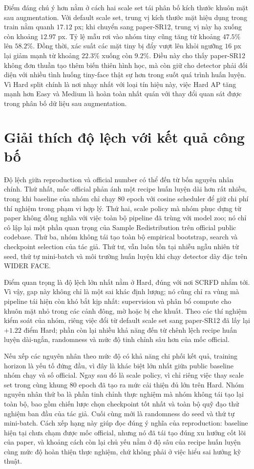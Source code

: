 Điểm đáng chú ý hơn nằm ở cách hai scale set tái phân bố kích thước khuôn mặt sau augmentation. Với default scale set, trung vị kích thước mặt hiệu dụng trong train nằm quanh \(17.12\) px; khi chuyển sang paper-SR12, trung vị này hạ xuống còn khoảng \(12.97\) px. Tỷ lệ mẫu rơi vào nhóm tiny cũng tăng từ khoảng \(47.5\%\) lên \(58.2\%\). Đồng thời, xác suất các mặt tiny bị đẩy vượt lên khỏi ngưỡng \(16\) px lại giảm mạnh từ khoảng \(22.3\%\) xuống còn \(9.2\%\). Điều này cho thấy paper-SR12 không đơn thuần tạo thêm biến thiên hình học, mà còn giữ cho detector phải đối diện với nhiều tình huống tiny-face thật sự hơn trong suốt quá trình huấn luyện. Vì Hard split chính là nơi nhạy nhất với loại tín hiệu này, việc Hard AP tăng mạnh hơn Easy và Medium là hoàn toàn nhất quán với thay đổi quan sát được trong phân bố dữ liệu sau augmentation.

\section{Giải thích độ lệch với kết quả công bố}

Độ lệch giữa reproduction và official number có thể đến từ bốn nguyên nhân chính. Thứ nhất, mốc official phản ánh một recipe huấn luyện dài hơn rất nhiều, trong khi baseline của nhóm chỉ chạy 80 epoch với cosine scheduler để giữ chi phí thí nghiệm trong phạm vi hợp lý. Thứ hai, scale policy mà nhóm phục dựng từ paper không đồng nghĩa với việc toàn bộ pipeline đã trùng với model zoo; nó chỉ cô lập lại một phần quan trọng của Sample Redistribution trên official public codebase. Thứ ba, nhóm không tái tạo toàn bộ empirical bootstrap, search và checkpoint selection của tác giả. Thứ tư, vẫn luôn tồn tại nhiễu ngẫu nhiên từ seed, thứ tự mini-batch và môi trường huấn luyện khi chạy detector dày đặc trên WIDER FACE.

Điểm quan trọng là độ lệch lớn nhất nằm ở Hard, đúng với nơi SCRFD nhắm tới. Vì vậy, gap này không chỉ là một sai khác định lượng; nó cũng chỉ ra vùng mà pipeline tái hiện còn khó bắt kịp nhất: supervision và phân bổ compute cho khuôn mặt nhỏ trong các cảnh đông, mờ hoặc bị che khuất. Theo các thí nghiệm kiểm soát của nhóm, riêng việc đổi từ default scale set sang paper-SR12 đã lấy lại \(+1.22\) điểm Hard; phần còn lại nhiều khả năng đến từ chênh lệch recipe huấn luyện dài-ngắn, randomness và mức độ tinh chỉnh sâu hơn của mốc official.

Nếu xếp các nguyên nhân theo mức độ có khả năng chi phối kết quả, training horizon là yếu tố đứng đầu, vì đây là khác biệt lớn nhất giữa public baseline nhóm chạy và số official. Ngay sau đó là scale policy, vì chỉ riêng việc thay scale set trong cùng khung 80 epoch đã tạo ra mức cải thiện đủ lớn trên Hard. Nhóm nguyên nhân thứ ba là phần tinh chỉnh thực nghiệm mà nhóm không tái tạo lại toàn bộ, bao gồm chiến lược chọn checkpoint tốt nhất và toàn bộ quỹ đạo thử nghiệm ban đầu của tác giả. Cuối cùng mới là randomness do seed và thứ tự mini-batch. Cách xếp hạng này giúp đọc đúng ý nghĩa của reproduction: baseline hiện tại chưa chạm được mốc official, nhưng nó đã tái tạo đúng xu hướng cốt lõi của paper, và khoảng cách còn lại chủ yếu nằm ở độ sâu của recipe huấn luyện cùng mức độ hoàn thiện thực nghiệm, chứ không phải ở việc hiểu sai hướng kỹ thuật.

